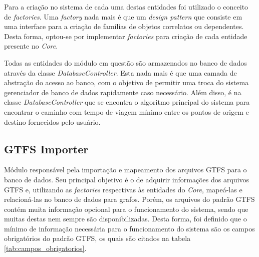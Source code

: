 Para a criação no sistema de cada uma destas entidades foi utilizado o conceito de \emph{factories}. 
Uma \emph{factory} nada mais é que um \emph{design pattern} que consiste em uma interface para a criação de famílias de objetos correlatos ou dependentes.
Desta forma, optou-se por implementar \emph{factories} para criação de cada entidade presente no \emph{Core}.

Todas as entidades do módulo em questão são armazenados no banco de dados através da classe \emph{DatabaseController}.
Esta nada mais é que uma camada de abstração do acesso ao banco, com o objetivo de permitir uma troca do sistema gerenciador de banco de dados rapidamente caso necessário.
Além disso, é na classe \emph{DatabaseController} que se encontra o algoritmo principal do sistema para encontrar o caminho com tempo de viagem mínimo entre os pontos de origem e destino fornecidos pelo usuário.


\subsection{GTFS Importer}
Módulo responsável pela importação e mapeamento dos arquivos GTFS para o banco de dados. 
Seu principal objetivo é o de adquirir informações dos arquivos GTFS e, utilizando as \emph{factories} respectivas às entidades do \emph{Core}, mapeá-las e relacioná-las no banco de dados para grafos.
Porém, os arquivos do padrão GTFS contém muita informação opcional para o funcionamento do sistema, sendo que muitas destas nem sempre são disponibilizadas. 
Desta forma, foi definido que o mínimo de informação necessária para o funcionamento do sistema são os campos obrigatórios do padrão GTFS, os quais são citados na tabela \ref{tab:campos_obrigatorios}.

